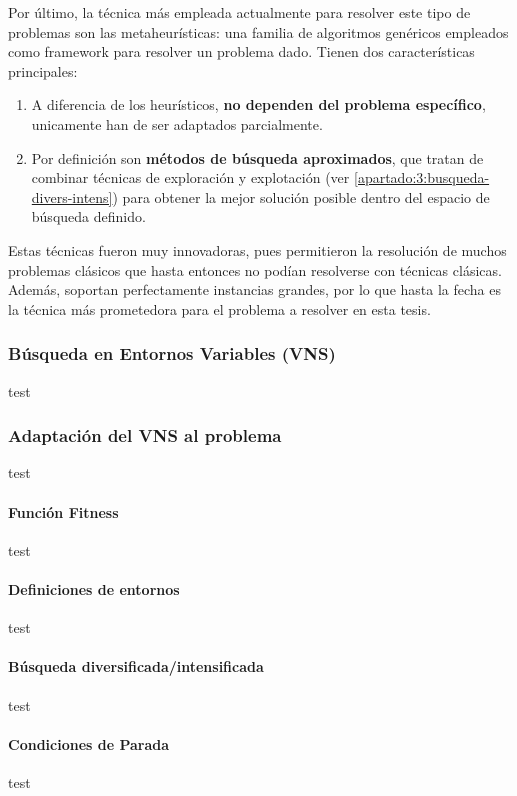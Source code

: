 Por último, la técnica más empleada actualmente para resolver este tipo de problemas son las metaheurísticas: una familia de algoritmos genéricos empleados como framework para resolver un problema dado. Tienen dos características principales: \cite{bibid}

\begin{enumerate}
	\item A diferencia de los heurísticos, \textbf{no dependen del problema específico}, unicamente han de ser adaptados parcialmente.
	\item Por definición son \textbf{métodos de búsqueda aproximados}, que tratan de combinar técnicas de exploración y explotación (ver \autoref{apartado:3:busqueda-divers-intens}) para obtener la mejor solución posible dentro del espacio de búsqueda definido.
\end{enumerate}

Estas técnicas fueron muy innovadoras, pues permitieron la resolución de muchos problemas clásicos que hasta entonces no podían resolverse con técnicas clásicas. Además, soportan perfectamente instancias grandes, por lo que hasta la fecha es la técnica más prometedora para el problema a resolver en esta tesis.







\subsubsection{Búsqueda en Entornos Variables (VNS)}
test
\subsubsection{Adaptación del VNS al problema}
test
\paragraph{Función Fitness} 
test

\paragraph{Definiciones de entornos}
test

\paragraph{Búsqueda diversificada/intensificada} \label{apartado:3:busqueda-divers-intens}
test

\paragraph{Condiciones de Parada}
test










